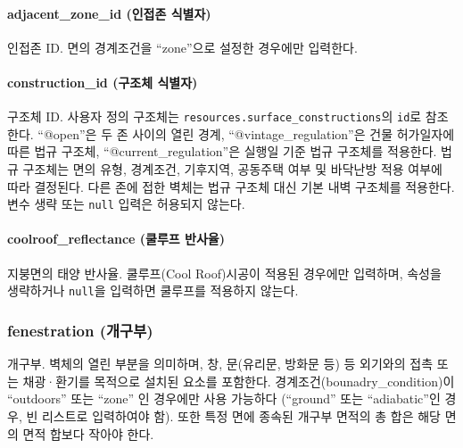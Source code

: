 \paragraph{adjacent\_zone\_id (인접존 식별자)} 인접존 ID. 면의 경계조건을 ``zone''으로 설정한 경우에만 입력한다.

\paragraph{construction\_id (구조체 식별자)} 구조체 ID. 사용자 정의 구조체는 \texttt{resources.surface\_constructions}의 \texttt{id}로 참조한다. ``@open''은 두 존 사이의 열린 경계, ``@vintage\_regulation''은 건물 허가일자에 따른 법규 구조체, ``@current\_regulation''은 실행일 기준 법규 구조체를 적용한다. 법규 구조체는 면의 유형, 경계조건, 기후지역, 공동주택 여부 및 바닥난방 적용 여부에 따라 결정된다. 다른 존에 접한 벽체는 법규 구조체 대신 기본 내벽 구조체를 적용한다. 변수 생략 또는 \texttt{null} 입력은 허용되지 않는다.

\paragraph{coolroof\_reflectance (쿨루프 반사율)} 지붕면의 태양 반사율. 쿨루프(Cool Roof)시공이 적용된 경우에만 입력하며, 속성을 생략하거나 \texttt{null}을 입력하면 쿨루프를 적용하지 않는다.

\subsubsection{fenestration (개구부)} \label{subsubsection:ioref:fenestration} 개구부. 벽체의 열린 부분을 의미하며, 창, 문(유리문, 방화문 등) 등 외기와의 접촉 또는 채광·환기를 목적으로 설치된 요소를 포함한다. 경계조건(bounadry\_condition)이 ``outdoors'' 또는 ``zone'' 인 경우에만 사용 가능하다 (``ground'' 또는 ``adiabatic''인 경우, 빈 리스트로 입력하여야 함). 또한 특정 면에 종속된 개구부 면적의 총 합은 해당 면의 면적 합보다 작아야 한다.



